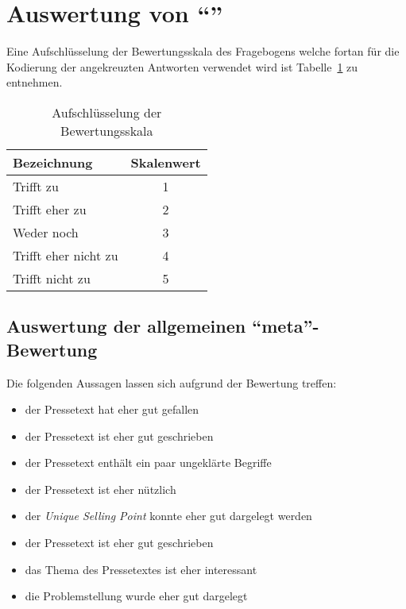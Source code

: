 


 





\section{Auswertung von \enquote{\varpressetext}}

Eine Aufschlüsselung der Bewertungsskala des Fragebogens welche fortan für die
Kodierung der angekreuzten Antworten verwendet wird ist
Tabelle~\ref{tab:skala} zu entnehmen.

\begin{table}[!ht]
    \caption{Aufschlüsselung der Bewertungsskala}
    \label{tab:skala}
    \begin{center}
        \begin{tabular}{lc}
        \toprule
        \textbf{Bezeichnung} & \textbf{Skalenwert} \\
        \midrule
        Trifft zu & 1 \\
        Trifft eher zu & 2 \\
        Weder noch & 3 \\
        Trifft eher nicht zu & 4 \\
        Trifft nicht zu & 5 \\
        \bottomrule
        \end{tabular}
    \end{center}
\end{table}

\subsection{Auswertung der allgemeinen \enquote{meta}-Bewertung}

Die folgenden Aussagen lassen sich aufgrund der Bewertung treffen:

\begin{itemize}
    \item der Pressetext hat eher gut gefallen
    \item der Pressetext ist eher gut geschrieben
    \item der Pressetext enthält ein paar ungeklärte Begriffe
    \item der Pressetext ist eher nützlich
    \item der \emph{Unique Selling Point} konnte eher gut dargelegt werden
    \item der Pressetext ist eher gut geschrieben
    \item das Thema des Pressetextes ist eher interessant
    \item die Problemstellung wurde eher gut dargelegt
\end{itemize}

